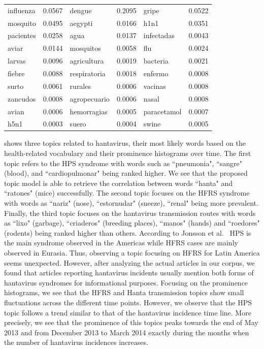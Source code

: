 \documentclass[conference]{IEEEtran}
\begin{document}
\begin{table}[t]
\begin{center}
\begin{tabular}{|lr|lr|lr|}
influenza & 0.0567 & dengue & 0.2095 & gripe & 0.0522 \\
mosquito & 0.0495 & aegypti & 0.0166 & h1n1 & 0.0351 \\
pacientes & 0.0258 & agua & 0.0137  & infectadas &0.0043 \\
aviar & 0.0144 & mosquitos & 0.0058  & flu & 0.0024\\
larvas & 0.0096 & agricultura & 0.0019 & bacteria & 0.0021 \\
fiebre & 0.0088 & respiratoria & 0.0018 & enfermo & 0.0008 \\
surto & 0.0061 & rurales & 0.0006 & vacinas & 0.0008 \\
zancudos & 0.0008 & agropecuario	 & 0.0006 & nasal & 0.0008 \\
avian & 0.0006 & hemorragias & 0.0005 & paracetamol & 0.0007 \\
h5n1 & 0.0003 & suero & 0.0004 & swine & 0.0005 \\
\hline
\end{tabular}\label{tab:common_topics}
\end{center}
\end{table}


 shows three topics related to hantavirus, their most likely words based on the health-related vocabulary and their prominence histograms over time. 
The first topic refers to the HPS syndrome with words such as ``pneumonia", ``sangre" (blood), and ``cardiopulmonar" being ranked higher. We see that the proposed topic model is able to retrieve the correlation between words ``hanta" and ``ratones" (mice) successfully. The second topic focuses on the HFRS syndrome with words as  ``nariz" (nose), ``estornudar" (sneeze), ``renal" being more prevalent. Finally, the third topic focuses on the hantavirus transmission routes with words as ``lixo" (garbage), ``criaderos" (breeding places), ``manos" (hands) and ``roedores" (rodents) being ranked higher than others. According to Jonsson et al.~\cite{jonsson:10} HPS is the main syndrome observed in the Americas while HFRS cases are mainly observed in Eurasia. Thus, observing a topic focusing on HFRS for Latin America seems unexpected. However, after analyzing the actual articles in our corpus, we found that articles reporting hantavirus incidents usually mention both forms of hantavirus syndromes for informational purposes. Focusing on the prominence histograms, we see that the HFRS and Hanta transmission topics show small fluctuations across the different time points. However, we observe that the HPS topic follows a trend similar to that of the hantavirus incidence time line. More precisely, we see that the prominence of this topics peaks towards the end of May 2013 and from December 2013 to March 2014 exactly during the months when the number of hantavirus incidences increases.
\end{document}
